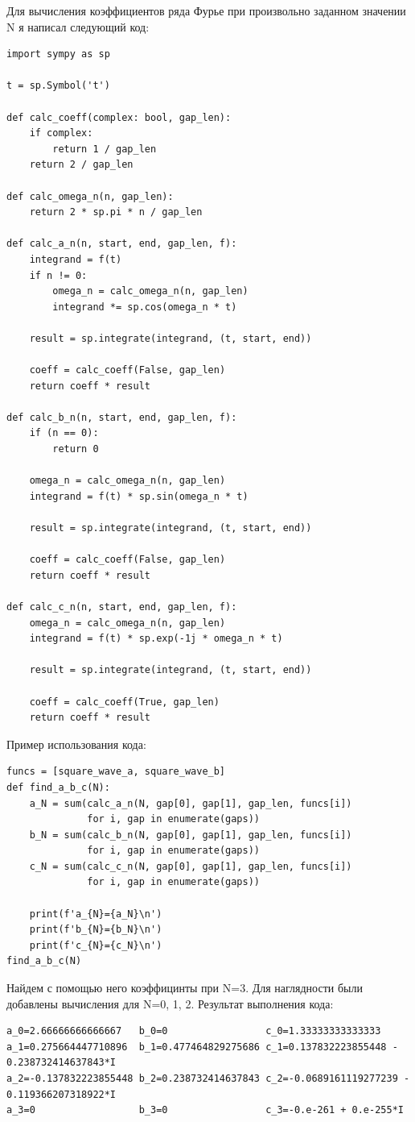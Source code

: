 \documentclass[a4paper, 16pt]{article}
\begin{document}
\newpage
\noindent Для вычисления коэффициентов ряда Фурье при произвольно заданном значении N я написал следующий код:
\begin{lstlisting}
import sympy as sp

t = sp.Symbol('t')

def calc_coeff(complex: bool, gap_len):
    if complex:
        return 1 / gap_len
    return 2 / gap_len

def calc_omega_n(n, gap_len):
    return 2 * sp.pi * n / gap_len

def calc_a_n(n, start, end, gap_len, f):
    integrand = f(t)
    if n != 0:
        omega_n = calc_omega_n(n, gap_len)
        integrand *= sp.cos(omega_n * t)
        
    result = sp.integrate(integrand, (t, start, end))

    coeff = calc_coeff(False, gap_len)
    return coeff * result

def calc_b_n(n, start, end, gap_len, f):
    if (n == 0):
        return 0

    omega_n = calc_omega_n(n, gap_len)
    integrand = f(t) * sp.sin(omega_n * t)
        
    result = sp.integrate(integrand, (t, start, end))

    coeff = calc_coeff(False, gap_len)
    return coeff * result

def calc_c_n(n, start, end, gap_len, f):
    omega_n = calc_omega_n(n, gap_len)
    integrand = f(t) * sp.exp(-1j * omega_n * t)

    result = sp.integrate(integrand, (t, start, end))

    coeff = calc_coeff(True, gap_len)
    return coeff * result
\end{lstlisting}


\noindent Пример использования кода:
\begin{lstlisting}
funcs = [square_wave_a, square_wave_b]
def find_a_b_c(N):
    a_N = sum(calc_a_n(N, gap[0], gap[1], gap_len, funcs[i])
              for i, gap in enumerate(gaps))
    b_N = sum(calc_b_n(N, gap[0], gap[1], gap_len, funcs[i])
              for i, gap in enumerate(gaps))
    c_N = sum(calc_c_n(N, gap[0], gap[1], gap_len, funcs[i]) 
              for i, gap in enumerate(gaps))

    print(f'a_{N}={a_N}\n')
    print(f'b_{N}={b_N}\n')
    print(f'c_{N}={c_N}\n')
find_a_b_c(N)
\end{lstlisting}


\noindent Найдем с помощью него коэффицинты при N=3. Для наглядности были добавлены вычисления для N=0, 1, 2.
Результат выполнения кода:
\begin{lstlisting}
a_0=2.66666666666667   b_0=0                 c_0=1.33333333333333
a_1=0.275664447710896  b_1=0.477464829275686 c_1=0.137832223855448 - 0.238732414637843*I
a_2=-0.137832223855448 b_2=0.238732414637843 c_2=-0.0689161119277239 - 0.119366207318922*I
a_3=0                  b_3=0                 c_3=-0.e-261 + 0.e-255*I
\end{lstlisting}
\end{document}
